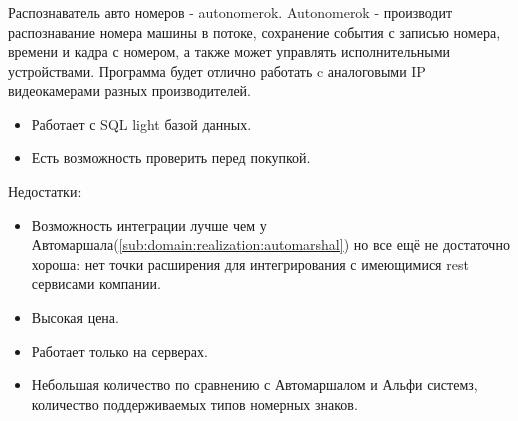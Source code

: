 \subsubsection{}
Распознаватель авто номеров - autonomerok. Autonomerok - производит распознавание номера машины в потоке, сохранение события с записью номера, времени и кадра с номером, а также может управлять исполнительными устройствами. Программа будет отлично работать c аналоговыми IP видеокамерами разных производителей.
\begin{itemize}
  \item Работает с SQL light базой данных.
  \item Есть возможность проверить перед покупкой.
\end{itemize}
Недостатки:
\begin{itemize}
  \item Возможность интеграции лучше чем у Автомаршала(\ref{sub:domain:realization:automarshal}) но все ещё не достаточно хороша: нет точки расширения для интегрирования с имеющимися rest сервисами компании.
  \item Высокая цена.
  \item Работает только на \windows{} серверах.
  \item Небольшая количество по сравнению с Автомаршалом и Альфи системз, количество поддерживаемых типов номерных знаков.
\end{itemize}
